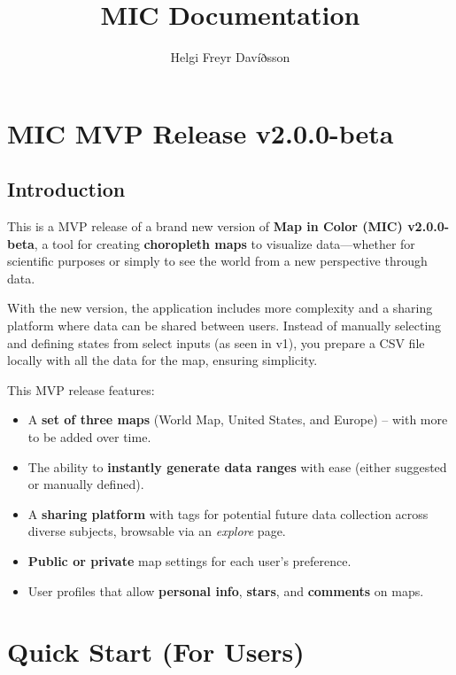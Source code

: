 \documentclass{article}
\title{MIC Documentation}
\author{Helgi Freyr Davíðsson}
\date{} %
\begin{document}
\maketitle

\section{MIC MVP Release v2.0.0-beta}

\subsection{Introduction}
This is a MVP release of a brand new version of \textbf{Map in Color (MIC) v2.0.0-beta},
a tool for creating \textbf{choropleth maps} to visualize data---whether for scientific 
purposes or simply to see the world from a new perspective through data.

With the new version, the application includes more complexity and a sharing platform 
where data can be shared between users. Instead of manually selecting and defining 
states from select inputs (as seen in v1), you prepare a CSV file locally with all 
the data for the map, ensuring simplicity.

This MVP release features:
\begin{itemize}
  \item A \textbf{set of three maps} (World Map, United States, and Europe) -- with 
        more to be added over time.
  \item The ability to \textbf{instantly generate data ranges} with ease (either 
        suggested or manually defined).
  \item A \textbf{sharing platform} with tags for potential future data collection 
        across diverse subjects, browsable via an \emph{explore} page.
  \item \textbf{Public or private} map settings for each user’s preference.
  \item User profiles that allow \textbf{personal info}, \textbf{stars}, 
        and \textbf{comments} on maps.
\end{itemize}

\section{Quick Start (For Users)}
\end{document}
